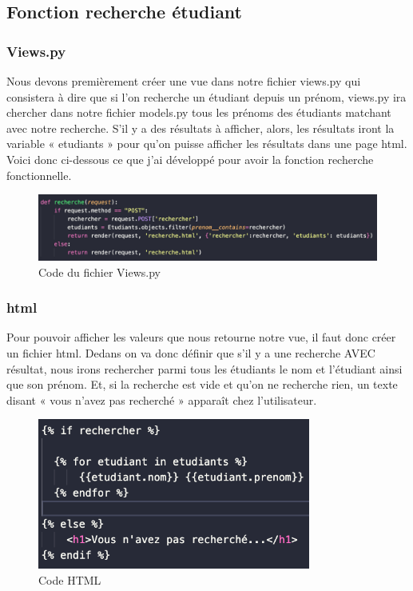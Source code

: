 \documentclass[12pt, a4paper]{article}
\begin{document}
        \subsection{Fonction recherche étudiant}
            \subsubsection{Views.py}
            Nous devons premièrement créer une vue dans notre fichier views.py qui consistera à dire que si l’on recherche un étudiant depuis un prénom, views.py ira chercher dans notre fichier models.py tous les prénoms des étudiants matchant avec notre recherche. S’il y a des résultats à afficher, alors, les résultats iront la variable « etudiants » pour qu’on puisse afficher les résultats dans une page html. Voici donc ci-dessous ce que j’ai développé pour avoir la fonction recherche fonctionnelle. 
            \begin{figure}[h]
                \centering
                \includegraphics[width=1\textwidth]{recherche.png}
                \caption{Code du fichier Views.py}
                \label{fig:recherche}
            \end{figure}
            \newpage
            \subsubsection{html}
            Pour pouvoir afficher les valeurs que nous retourne notre vue, il faut donc créer un fichier html. Dedans on va donc définir que s’il y a une recherche AVEC résultat, nous irons rechercher parmi tous les étudiants le nom et l’étudiant ainsi que son prénom. Et, si la recherche est vide et qu’on ne recherche rien, un texte disant « vous n’avez pas recherché » apparaît chez l’utilisateur. 
            \begin{figure}[h]
                \centering
                \includegraphics[width=0.8\textwidth]{html.png}
                \caption{Code HTML}
                \label{fig:html}
            \end{figure}
\end{document}

